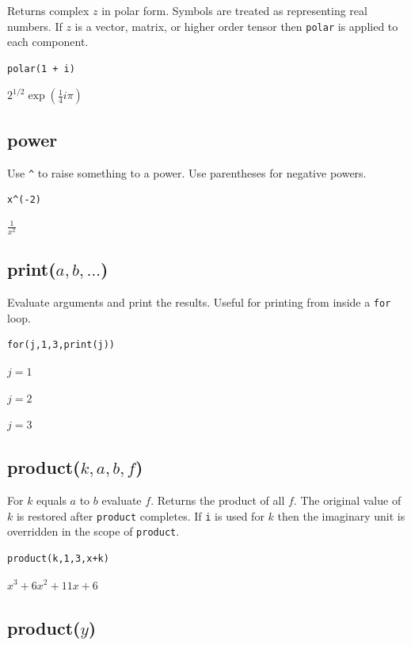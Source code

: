 \documentclass[12pt]{article}
\begin{document}
Returns complex $z$ in polar form.
Symbols are treated as representing real numbers.
If $z$ is a vector, matrix, or higher order tensor then
\verb$polar$ is applied to each component.

{\color{blue}
\begin{verbatim}
polar(1 + i)
\end{verbatim}
}

$2^{1/2}\exp\left(\frac{1}{4}i\pi\right)$

\subsection*{power}

Use \verb$^$ to raise something to a power.
Use parentheses for negative powers.

{\color{blue}
\begin{verbatim}
x^(-2)
\end{verbatim}
}

$\displaystyle \frac{1}{x^2}$

\subsection*{print($a,b,\ldots$)}

Evaluate arguments and print the results.
Useful for printing from inside a {\tt for} loop.

{\color{blue}
\begin{verbatim}
for(j,1,3,print(j))
\end{verbatim}
}

$j=1$

$j=2$

$j=3$

\subsection*{product($k,a,b,f$)}

For $k$ equals $a$ to $b$ evaluate $f$.
Returns the product of all $f$.
The original value of $k$ is restored after \verb$product$ completes.
If \verb$i$ is used for $k$ then the imaginary unit is overridden in the scope of \verb$product$.

{\color{blue}
\begin{verbatim}
product(k,1,3,x+k)
\end{verbatim}
}

$\displaystyle x^3+6x^2+11x+6$

\subsection*{product($y$)}
\end{document}
